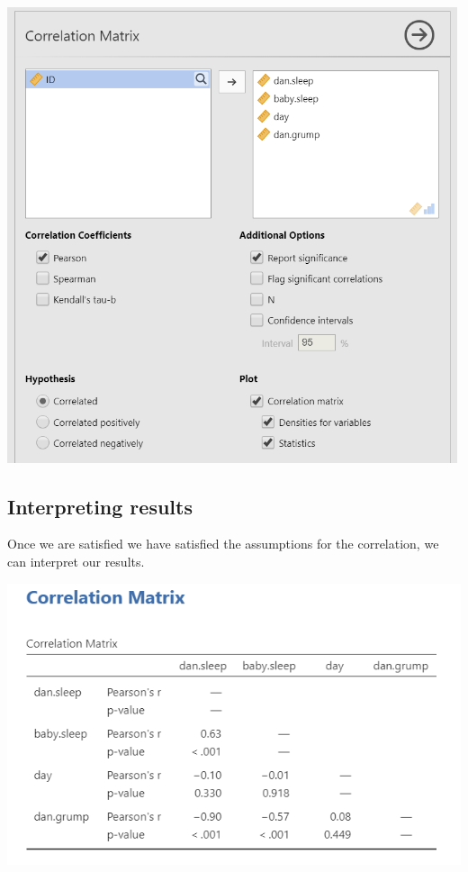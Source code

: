 \documentclass[
]{book}
\begin{document}
\includegraphics[width=5.20833in,height=\textheight]{images/08-correlation/correlation-setup.png}

\hypertarget{interpreting-results-2}{%
\subsection{Interpreting results}\label{interpreting-results-2}}

Once we are satisfied we have satisfied the assumptions for the correlation, we can interpret our results.

\includegraphics{images/08-correlation/correlation-matrix.png}
\end{document}
